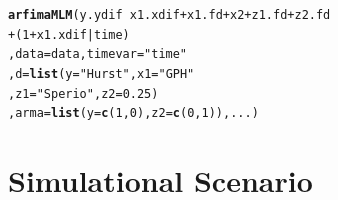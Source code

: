 \documentclass{beamer}\usepackage[]{graphicx}\usepackage[]{color}
\makeatletter
\newcommand{\hlnum}[1]{\textcolor[rgb]{0.686,0.059,0.569}{#1}}%
\newcommand{\hlstr}[1]{\textcolor[rgb]{0.192,0.494,0.8}{#1}}%
\newcommand{\hlopt}[1]{\textcolor[rgb]{0,0,0}{#1}}%
\newcommand{\hlstd}[1]{\textcolor[rgb]{0.345,0.345,0.345}{#1}}%
\newcommand{\hlkwc}[1]{\textcolor[rgb]{0.333,0.667,0.333}{#1}}%
\newcommand{\hlkwd}[1]{\textcolor[rgb]{0.737,0.353,0.396}{\textbf{#1}}}%
\newenvironment{kframe}{%
 \def\at@end@of@kframe{}%
 \ifinner\ifhmode%
  \def\at@end@of@kframe{\end{minipage}}%
  \begin{minipage}{\columnwidth}%
 \fi\fi%
 \def\FrameCommand##1{\hskip\@totalleftmargin \hskip-\fboxsep
 \colorbox{shadecolor}{##1}\hskip-\fboxsep
     \hskip-\linewidth \hskip-\@totalleftmargin \hskip\columnwidth}%
 \MakeFramed {\advance\hsize-\width
   \@totalleftmargin\z@ \linewidth\hsize
   \@setminipage}}%
 {\par\unskip\endMakeFramed%
 \at@end@of@kframe}
\newenvironment{knitrout}{}{} %
\makeatother
\begin{document}
\begin{frame}
\begin{knitrout}
\begin{kframe}
\end{kframe}
\end{knitrout}
\framebreak
\begin{knitrout}
\color{fgcolor}\begin{kframe}
\begin{alltt}
\hlkwd{arfimaMLM}\hlstd{(y.ydif} \hlopt{~} \hlstd{x1.xdif} \hlopt{+} \hlstd{x1.fd} \hlopt{+} \hlstd{x2} \hlopt{+} \hlstd{z1.fd} \hlopt{+} \hlstd{z2.fd}
          \hlopt{+} \hlstd{(}\hlnum{1} \hlopt{+} \hlstd{x1.xdif} \hlopt{|} \hlstd{time)}
          \hlstd{,} \hlkwc{data} \hlstd{= data,} \hlkwc{timevar} \hlstd{=} \hlstr{"time"}
          \hlstd{,} \hlkwc{d} \hlstd{=} \hlkwd{list}\hlstd{(}\hlkwc{y} \hlstd{=} \hlstr{"Hurst"}\hlstd{,} \hlkwc{x1} \hlstd{=} \hlstr{"GPH"}
                   \hlstd{,} \hlkwc{z1} \hlstd{=} \hlstr{"Sperio"}\hlstd{,} \hlkwc{z2} \hlstd{=} \hlnum{0.25}\hlstd{)}
          \hlstd{,} \hlkwc{arma} \hlstd{=} \hlkwd{list}\hlstd{(}\hlkwc{y} \hlstd{=} \hlkwd{c}\hlstd{(}\hlnum{1}\hlstd{,}\hlnum{0}\hlstd{),} \hlkwc{z2} \hlstd{=} \hlkwd{c}\hlstd{(}\hlnum{0}\hlstd{,}\hlnum{1}\hlstd{)), ...)}
\end{alltt}
\end{kframe}
\end{knitrout}
\end{frame}

\section{Simulational Scenario}
\end{document}
